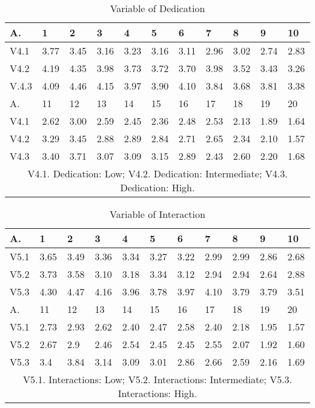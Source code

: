 \documentclass[english]{textolivre}
\begin{document}
\begin{table}[htpb]
\caption{Variable of Dedication}
\label{figure6}
\centering
\begin{tabular}{lllllllllll}
\toprule
A. & 1 & 2 & 3 & 4 & 5 & 6 & 7 & 8 & 9 & 10
\\ 
\midrule
V4.1 & 3.77 & 3.45 & 3.16 & 3.23 & 3.16 & 3.11 & 2.96 & 3.02 & 2.74 & 2.83
\\
V4.2 & 4.19 & 4.35 & 3.98 & 3.73 & 3.72 & 3.70 & 3.98 & 3.52 & 3.43 & 3.26
\\
V.4.3 & 4.09 & 4.46 & 4.15 & 3.97 & 3.90 & 4.10 & 3.84 & 3.68 & 3.81 & 3.38
\\
\midrule
A. & 11 & 12 & 13 & 14 & 15 & 16 & 17 & 18 & 19 & 20
\\
\midrule
V4.1 & 2.62 & 3.00 & 2.59 & 2.45 & 2.36 & 2.48 & 2.53 & 2.13 & 1.89 & 1.64
\\
V4.2 & 3.29 & 3.45 & 2.88 & 2.89 & 2.84 & 2.71 & 2.65 & 2.34 & 2.10 & 1.57
\\
V4.3 & 3.40 & 3.71 & 3.07 & 3.09 & 3.15 & 2.89 & 2.43 & 2.60 & 2.20 & 1.68
\\ 
\midrule
\multicolumn{11}{c}{V4.1. Dedication: Low; V4.2. Dedication: Intermediate; V4.3. Dedication: High.}
\\
\bottomrule
\end{tabular}
\end{table}

\begin{table}[htpb]
\caption{Variable of Interaction}
\label{figure7}
\centering
\begin{tabular}{lllllllllll}
\toprule
A. & 1 & 2 & 3 & 4 & 5 & 6 & 7 & 8 & 9 & 10
\\ 
\midrule
V5.1 & 3.65 & 3.49 & 3.36 & 3.34 & 3.27 & 3.22 & 2.99 & 2.99 & 2.86 & 2.68
\\
V5.2 & 3.73 & 3.58 & 3.10 & 3.18 & 3.34 & 3.12 & 2.94 & 2.94 & 2.64 & 2.88
\\
V5.3 & 4.30 & 4.47 & 4.16 & 3.96 & 3.78 & 3.97 & 4.10 & 3.79 & 3.79 & 3.51
\\
\midrule
A. & 11 & 12 & 13 & 14 & 15 & 16 & 17 & 18 & 19 & 20
\\
\midrule
V5.1 & 2.73 & 2.93 & 2.62 & 2.40 & 2.47 & 2.58 & 2.40 & 2.18 & 1.95 & 1.57
\\
V5.2 & 2.67 & 2.9 & 2.46 & 2.54 & 2.45 & 2.45 & 2.55 & 2.07 & 1.92 & 1.60
\\
V5.3 & 3.4 & 3.84 & 3.14 & 3.09 & 3.01 & 2.86 & 2.66 & 2.59 & 2.16 & 1.69
\\ 
\midrule
\multicolumn{11}{c}{V5.1. Interactions: Low; V5.2. Interactions: Intermediate; V5.3. Interactions: High.}
\\
\bottomrule
\end{tabular}
\end{table}
\end{document}

